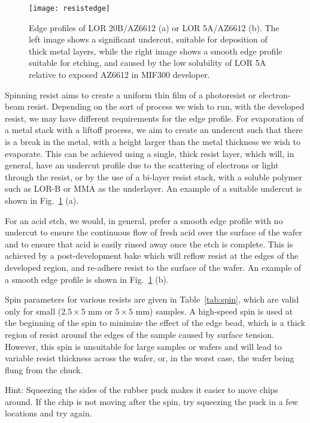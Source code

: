 \begin{figure}
    \texttt{[image: resistedge]}
    \caption[Edge profiles of two resists]
    {\label{fig:resistedge}Edge profiles of LOR 20B/AZ6612 (a) or LOR 5A/AZ6612 (b). The left image shows a significant undercut,
    suitable for deposition of thick metal layers, while the right image shows a smooth edge profile suitable for etching, and caused
    by the low solubility of LOR 5A relative to exposed AZ6612 in MIF300 developer. }
\end{figure}

Spinning resist aims to create a uniform thin film of a photoresist or electron-beam resist. Depending on the sort of process we wish
to run, with the developed resist, we may have different requirements for the edge profile. For evaporation of a metal stack with a
liftoff process, we aim to create an undercut such that there is a break in the metal, with a height larger than the metal thickness we wish to evaporate. This can
be achieved using a single, thick resist layer, which will, in general, have an undercut profile due to the scattering of electrons or light through the resist, or by
the use of a bi-layer resist stack, with a soluble polymer such as LOR-B or MMA as the underlayer. An example of a suitable undercut is shown in Fig.~\ref{fig:resistedge} (a).

For an acid etch, we would, in general, prefer a smooth edge profile with no undercut to ensure the continuous flow of fresh acid over the
surface of the wafer and to ensure that acid is easily rinsed away once the etch is complete. This is achieved by a post-development bake which will reflow resist at the edges of the developed region, and re-adhere resist to the surface of the wafer. An example of a
smooth edge profile is shown in Fig.~\ref{fig:resistedge} (b).

Spin parameters for various resists are given in Table~\ref{tab:spin}, which are valid only for small ($2.5 \times 5$ \si{\milli\meter} or $5 \times 5$ \si{\milli\meter}) samples. A high-speed spin is used at the beginning of the spin to minimize the effect of the edge bead, which is a thick region of resist around the edges of the sample caused by surface tension. However, this spin is unsuitable for large samples or wafers and will lead to variable resist thickness across the wafer, or, in the worst case, the wafer being flung from the chuck.

Hint: Squeezing the sides of the rubber puck makes it easier to move chips around. If the chip is not moving after the spin, try squeezing the
puck in a few locations and try again.

